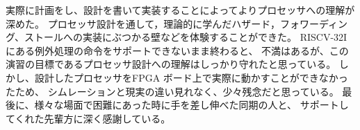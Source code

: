 \documentclass[../main.tex]{subfiles}
\begin{document}
    実際に計画をし、設計を書いて実装することによってよりプロセッサへの理解が深めた。
    プロセッサ設計を通して，理論的に学んだハザード，フォワーディング、ストールへの実装にぶつかる壁などを体験することができた。
    RISCV-32Iにある例外処理の命令をサポートできないまま終わると、
    不満はあるが、この演習の目標であるプロセッサ設計への理解はしっかり守れたと思っている。
    しかし、設計したプロセッサをFPGA ボード上で実際に動かすことができなかったため、 
    シムレーションと現実の違い見れなく、少々残念だと思っている。
    最後に、様々な場面で困難にあった時に手を差し伸べた同期の人と、
    サポートしてくれた先輩方に深く感謝している。
\end{document}
